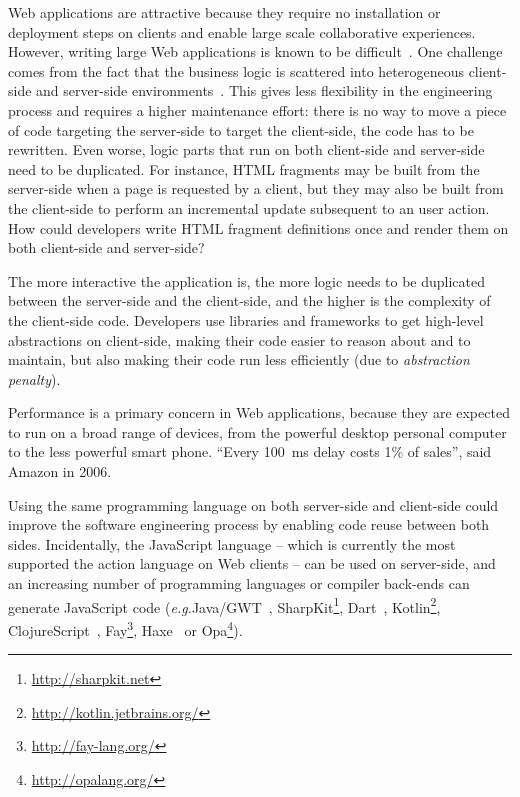 \documentclass[preprint]{sigplanconf}
\newcommand{\eg}{\emph{e.g.}}
\begin{document}
Web applications are attractive because they require no installation or deployment steps on clients and enable large
scale collaborative experiences. However, writing large Web applications is known to be
difficult~\cite{Mikkonen08_SpaghettiJs,Preciado05_RIAMethodologyNecessity}. One challenge comes from the fact
that the business logic is scattered into heterogeneous client-side and server-side
environments~\cite{Echeverria09_RIA,Kuuskeri09_PartitioningClientServer}. This gives less flexibility in the
engineering process and requires a higher maintenance effort: there is no way to move a piece of code targeting
the server-side to target the client-side, the code has to be rewritten. Even worse, logic parts that run on both
client-side and server-side need to be duplicated. For instance, HTML fragments may be built from the server-side
when a page is requested by a client, but they may also be built from the client-side to perform an incremental
update subsequent to an user action. How could developers write HTML fragment definitions once and render them on
both client-side and server-side?

The more interactive the application is, the more logic needs to be duplicated between the server-side and the
client-side, and the higher is the complexity of the client-side code. Developers use libraries and frameworks to get
high-level abstractions on client-side, making their code easier to reason about and to maintain, but also making
their code run less efficiently (due to \emph{abstraction penalty}).

Performance is a primary concern in Web applications, because they are expected to run on a broad range of devices,
from the powerful desktop personal computer to the less powerful smart phone. “Every 100~ms delay costs 1\% of
sales”, said Amazon in 2006.

Using the same programming language on both server-side and client-side could improve the software engineering
process by enabling code reuse between both sides. Incidentally, the JavaScript language -- which is currently the
most supported the action language on Web clients -- can be used on server-side, and an increasing number of
programming languages or compiler back-ends can generate JavaScript code (\eg Java/GWT~\cite{Chaganti07_GWT},
SharpKit\footnote{\href{http://sharpkit.net}{http://sharpkit.net}}, Dart~\cite{Griffith11_Dart},
Kotlin\footnote{\href{http://kotlin.jetbrains.org/}{http://kotlin.jetbrains.org/}},
ClojureScript~\cite{McGranaghan11_ClojureScript}, Fay\footnote{\href{http://fay-lang.org/}{http://fay-lang.org/}},
Haxe~\cite{Cannasse08_HaXe} or Opa\footnote{\href{http://opalang.org/}{http://opalang.org/}}).
\end{document}
